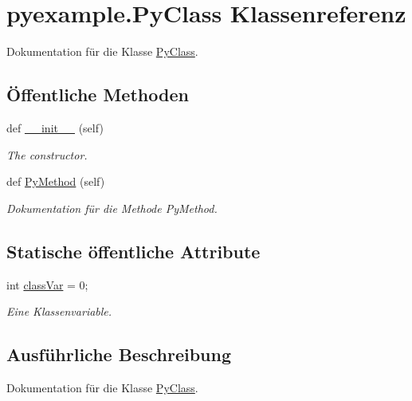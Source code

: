 \hypertarget{classpyexample_1_1_py_class}{}\section{pyexample.\+Py\+Class Klassenreferenz}
\label{classpyexample_1_1_py_class}


Dokumentation für die Klasse \mbox{\hyperlink{classpyexample_1_1_py_class}{Py\+Class}}.  


\subsection*{Öffentliche Methoden}
\begin{DoxyCompactItemize}
\item 
def \mbox{\hyperlink{classpyexample_1_1_py_class_a87e20fe7e81cb5a1c04e620c076ab8ac}{\+\_\+\+\_\+init\+\_\+\+\_\+}} (self)
\begin{DoxyCompactList}\small\item\em The constructor. \end{DoxyCompactList}\item 
def \mbox{\hyperlink{classpyexample_1_1_py_class_a654596774eb28a0c6d26eea565de3a9d}{Py\+Method}} (self)
\begin{DoxyCompactList}\small\item\em Dokumentation für die Methode Py\+Method. \end{DoxyCompactList}\end{DoxyCompactItemize}
\subsection*{Statische öffentliche Attribute}
\begin{DoxyCompactItemize}
\item 
int \mbox{\hyperlink{classpyexample_1_1_py_class_abd17aff54e5b0ca194020c796c733546}{class\+Var}} = 0;
\begin{DoxyCompactList}\small\item\em Eine Klassenvariable. \end{DoxyCompactList}\end{DoxyCompactItemize}


\subsection{Ausführliche Beschreibung}
Dokumentation für die Klasse \mbox{\hyperlink{classpyexample_1_1_py_class}{Py\+Class}}. 

